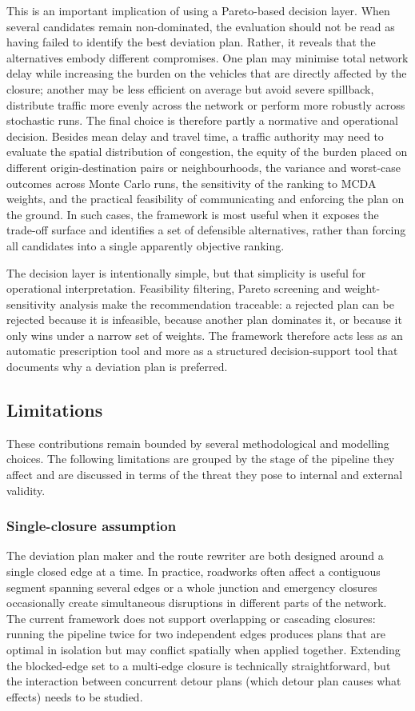 This is an important implication of using a Pareto-based decision layer. When
several candidates remain non-dominated, the evaluation should not be read as
having failed to identify the best deviation plan. Rather, it reveals that the
alternatives embody different compromises. One plan may minimise total network
delay while increasing the burden on the vehicles that are directly affected by
the closure; another may be less efficient on average but avoid severe
spillback, distribute traffic more evenly across the network or perform more
robustly across stochastic runs. The final choice is therefore partly a
normative and operational decision. Besides mean delay and travel time, a
traffic authority may need to evaluate the spatial distribution of congestion,
the equity of the burden placed on different origin-destination pairs or
neighbourhoods, the variance and worst-case outcomes across Monte Carlo runs,
the sensitivity of the ranking to MCDA weights, and the practical feasibility
of communicating and enforcing the plan on the ground. In such cases, the
framework is most useful when it exposes the trade-off surface and identifies a
set of defensible alternatives, rather than forcing all candidates into a
single apparently objective ranking.

The decision layer is intentionally simple, but that simplicity is useful for
operational interpretation. Feasibility filtering, Pareto screening and
weight-sensitivity analysis make the recommendation traceable: a rejected
plan can be rejected because it is infeasible, because another plan dominates
it, or because it only wins under a narrow set of weights. The framework
therefore acts less as an automatic prescription tool and more as a structured
decision-support tool that documents why a deviation plan is preferred.

\subsection{Limitations}

These contributions remain bounded by several methodological and modelling
choices. The following limitations are grouped by the stage of the pipeline
they affect and are discussed in terms of the threat they pose to internal and
external validity.

\subsubsection{Single-closure assumption}
The deviation plan maker and the route rewriter are both designed around a single closed edge at a
time. In practice, roadworks often affect a contiguous segment spanning several edges or a whole
junction and emergency closures occasionally create simultaneous disruptions in different parts of
the network. The current framework does not support overlapping or cascading closures: running
the pipeline twice for two independent edges produces plans that are optimal in isolation but may
conflict spatially when applied together. Extending the blocked-edge set to a multi-edge closure
is technically straightforward, but the interaction between concurrent detour plans (which
detour plan causes what effects) needs to be studied. 

